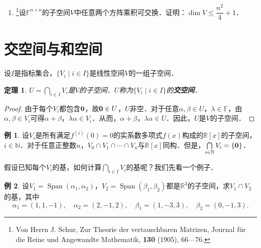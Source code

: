 \documentclass[a4paper,fontset=windows]{ctexbook}
\newtheorem{theorem}{定理}[chapter]
\theoremstyle{definition}
\newtheorem{example}{例}[chapter]
\DeclareMathOperator{\Span}{Span}
\renewcommand{\le}{\leqslant}
\begin{document}
\begin{enumerate}
\item \footnote{Von Herrn J. Schur, Zur Theorie der vertauschbaren Matrizen, Journal f\"ur die Reine und Angewandte Mathematik, {\bf 130} (1905), 66—76.}设$\mathbb{F}^{n\times n}$的子空间$V$中任意两个方阵乘积可交换．证明：$\dim V\le\dfrac{n^2}{4}+1$．

\end{enumerate}

\clearpage\section{交空间与和空间}

设$I$是指标集合，$\{V_i\mid i\in I\}$是线性空间$V$的一组子空间．

\begin{theorem}
$U=\bigcap\limits_{i\in I}V_i$是$V$的子空间．$U$称为$\{V_i\mid i\in I\}$的{\bf 交空间}．
\end{theorem}

\begin{proof}
由于每个$V_i$都包含${\bf 0}$，故${\bf 0}\in U$，$U$非空．对于任意$\alpha,\beta\in U$，$\lambda\in\mathbb{F}$，由$\alpha,\beta\in V_i$可得$\alpha+\beta$，$\lambda\alpha\in V_i$．从而，$\alpha+\beta$，$\lambda\alpha\in U$．因此，$U$是$V$的子空间．
\end{proof}

\begin{example}
设$V_i$是所有满足$f^{(i)}(0)=0$的实系数多项式$f(x)$构成的$\mathbb{R}[x]$的子空间，$i\in\mathbb{N}$．对于任意正整数$n$，$V_0\cap V_1\cap\cdots\cap V_n$与$\mathbb{R}[x]$同构．但是，$\bigcap\limits_{i\in\mathbb{N}}V_i=\{\bf 0\}$．
\end{example}

假设已知每个$V_i$的基，如何计算$\bigcap\limits_{i\in I}V_i$的基呢？我们先看一个例子．

\begin{example}
设$V_1=\Span(\alpha_1,\alpha_2)$，$V_2=\Span(\beta_1,\beta_2)$都是$\mathbb{R}^3$的子空间，求$V_1\cap V_2$的基，其中
$$\alpha_1=(1,1,-1),\quad\alpha_2=(2,-1,2),\quad\beta_1=(1,-3,3),\quad\beta_2=(0,-1,3).$$
\end{example}
\end{document}
